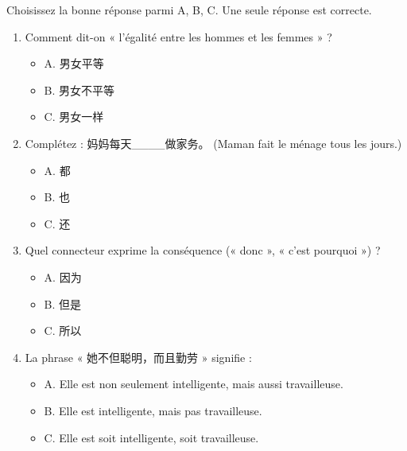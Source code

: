 \documentclass[11pt]{article}
\begin{document}
\begin{exercice}
Choisissez la bonne réponse parmi A, B, C. Une seule réponse est correcte.
\begin{enumerate}
    \item Comment dit-on « l'égalité entre les hommes et les femmes » ?
    \begin{itemize}
        \item A. 男女平等
        \item B. 男女不平等
        \item C. 男女一样
    \end{itemize}
    \item Complétez : 妈妈每天\_\_\_\_做家务。 (Maman fait le ménage tous les jours.)
    \begin{itemize}
        \item A. 都
        \item B. 也
        \item C. 还
    \end{itemize}
    \item Quel connecteur exprime la conséquence (« donc », « c'est pourquoi ») ?
    \begin{itemize}
        \item A. 因为
        \item B. 但是
        \item C. 所以
    \end{itemize}
    \item La phrase « 她不但聪明，而且勤劳 » signifie :
    \begin{itemize}
        \item A. Elle est non seulement intelligente, mais aussi travailleuse.
        \item B. Elle est intelligente, mais pas travailleuse.
        \item C. Elle est soit intelligente, soit travailleuse.
    \end{itemize}
\end{enumerate}
\end{exercice}
\end{document}
